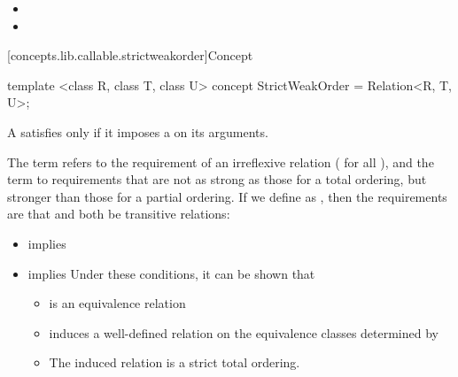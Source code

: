 \begin{addedblock}
\begin{itemdescr}
\begin{itemize}
\item {}
\item {}
\end{itemize}
\end{itemdescr}

[concepts.lib.callable.strictweakorder]{Concept }

%
\begin{itemdecl}
template <class R, class T, class U>
concept StrictWeakOrder = Relation<R, T, U>;
\end{itemdecl}

\begin{itemdescr}
\pnum
A  satisfies  only if
it imposes a  on its arguments.

\pnum
The term
refers to the
requirement of an irreflexive relation ( for all ),
and the term
to requirements that are not as strong as
those for a total ordering,
but stronger than those for a partial
ordering.
If we define
as
,
then the requirements are that
and
both be transitive relations:

\begin{itemize}
\item
{}
implies
\item
{}
implies
\enternote
Under these conditions, it can be shown that
\begin{itemize}
\item
{}
is an equivalence relation
\item
{}
induces a well-defined relation on the equivalence
classes determined by
\item
The induced relation is a strict total ordering.
\exitnote
\end{itemize}
\end{itemize}
\end{itemdescr}

\end{addedblock}
